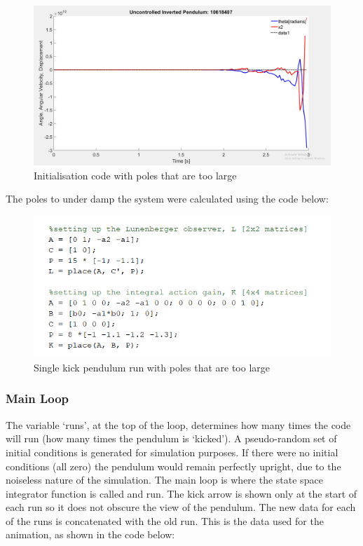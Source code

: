 \documentclass[11pt]{report}
\begin{document}
\begin{figure}[H]
\centerline{\includegraphics[width=12cm]{polesTooBig.png}}
\caption{Initialisation code with poles that are too large}
\label{fig}
\end{figure} 

The poles to under damp the system were calculated using the code below:

\begin{figure}[H]
\centerline{\includegraphics[width=12cm]{polesTooBigCode.png}}
\caption{Single kick pendulum run with poles that are too large}
\label{fig}
\end{figure}  

\subsubsection{Main Loop}

The variable `runs', at the top of the loop, determines how many times the code will run (how many times the pendulum is `kicked'). A pseudo-random set of initial conditions is generated for simulation purposes. If there were no initial conditions (all zero) the pendulum would remain perfectly upright, due to the noiseless nature of the simulation. The main loop is where the state space integrator function is called and run. The kick arrow is shown only at the start of each run so it does not obscure the view of the pendulum. The new data for each of the runs is concatenated with the old run. This is the data used for the animation, as shown in the code below: 
\end{document}
